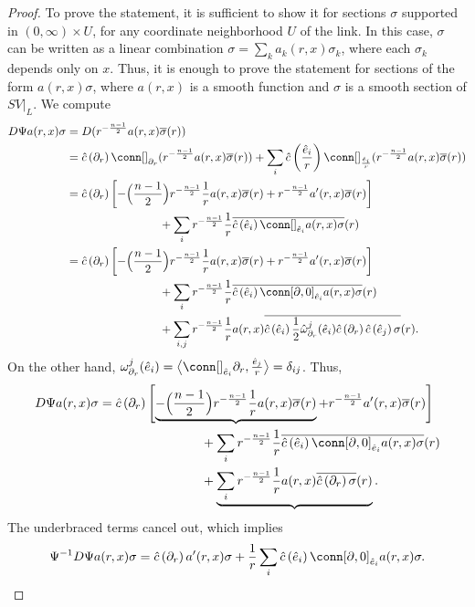 \documentclass[12pt, reqno]{amsart}
\theoremstyle{plain} %
\theoremstyle{definition}
\theoremstyle{remark}
\numberwithin{equation}{section}
\newcommand{\dom}[1]{\hat{#1}}
\newcommand{\cbar}[1]{\dom{c}\left(#1\right)}
\newcommand{\binner}[1]{\big< #1 \big>}
\begin{document}
\begin{proof}
    To prove the statement, it is sufficient to show it for sections \(\sigma\) supported in \((0, \infty) \times U\), for any coordinate neighborhood \(U\) of the link.
    In this case, \(\sigma\) can be written as a linear combination \(\sigma = \sum_k a_k(r,x) \sigma_k\), where each \(\sigma_k\) depends only on \(x\).
    Thus, it is enough to prove the statement for sections of the form \(a(r,x) \sigma\), where \(a(r,x)\) is a smooth function and \(\sigma\) is a smooth section of \(SV|_{\dom{L}}\).
    We compute
    \begin{align*}
        D\Psi a(r,x) \sigma &= D(r^{-\frac{n-1}{2}} a(r,x) \overline{\sigma}(r))\\
        &= \cbar{\partial_r} \conn[]_{\partial_r} (r^{-\frac{n-1}{2}} a(r,x) \overline{\sigma}(r)) + \sum_i \cbar{\frac{\dom{e}_i}{r}} \conn[]_{\frac{\dom{e}_i}{r}} (r^{-\frac{n-1}{2}} a(r,x) \overline{\sigma}(r))\\
        &=\cbar{\partial_r} \left[ -\Big( \frac{n-1}{2} \Big) r^{-\frac{n-1}{2}} \frac{1}{r} a(r,x) \overline{\sigma}(r) + r^{-\frac{n-1}{2}} a'(r,x) \overline{\sigma}(r) \right] \\
        &\qquad\qquad\qquad\qquad + \sum_i r^{-\frac{n-1}{2}} \frac{1}{r} \overline{\cbar{\dom{e}_i} \conn[]_{\dom{e}_i} a(r,x) \sigma}(r)\\
        &= \cbar{\partial_r} \left[ -\Big( \frac{n-1}{2} \Big) r^{-\frac{n-1}{2}} \frac{1}{r} a(r,x) \overline{\sigma}(r) + r^{-\frac{n-1}{2}} a'(r,x) \overline{\sigma}(r) \right] \\
        &\qquad\qquad\qquad\qquad + \sum_i r^{-\frac{n-1}{2}} \frac{1}{r} \overline{\cbar{\dom{e}_i} \conn[\partial, 0]_{\dom{e}_i} a(r,x) \sigma}(r)\\
        &\qquad\qquad\qquad\qquad + \sum_{i,j} r^{-\frac{n-1}{2}} \frac{1}{r} a(r,x) \overline{\cbar{\dom{e}_i} \frac{1}{2}\dom{\omega}_{\partial_r}^j(\dom{e}_i) \cbar{\partial_r} \cbar{\dom{e}_j} \sigma}(r).
    \end{align*}
    On the other hand, \(\omega_{\partial_r}^j (\dom{e}_i) = \binner{\conn[]_{\dom{e}_i} \partial_r, \frac{\dom{e}_j}{r}} = \delta_{ij}\).
    Thus,
    \begin{align*}
        D\Psi a(r,x) \sigma &= \cbar{\partial_r} \left[ \underbrace{-\Big( \frac{n-1}{2} \Big) r^{-\frac{n-1}{2}} \frac{1}{r} a(r,x) \overline{\sigma}(r)} + r^{-\frac{n-1}{2}} a'(r,x) \overline{\sigma}(r) \right] \\
        &\qquad\qquad\qquad\qquad + \sum_i r^{-\frac{n-1}{2}} \frac{1}{r} \overline{\cbar{\dom{e}_i} \conn[\partial, 0]_{\dom{e}_i} a(r,x) \sigma}(r) \\
        &\qquad\qquad\qquad\qquad + \underbrace{\sum_i r^{-\frac{n-1}{2}} \frac{1}{r} a(r,x) \overline{\cbar{\partial_r} \sigma}(r)}.
    \end{align*}
    The underbraced terms cancel out, which implies
    \begin{equation*}
        \Psi^{-1}D\Psi a(r,x) \sigma = \cbar{\partial_r} a'(r,x) \sigma + \frac{1}{r} \sum_i \cbar{\dom{e}_i} \conn[\partial, 0]_{\dom{e}_i} a(r,x) \sigma.
    \end{equation*}
\end{proof}
\end{document}
